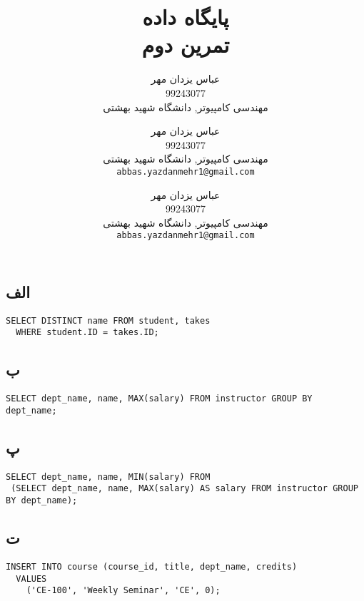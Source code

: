 \documentclass[a4paper]{article}
\author{
عباس یزدان مهر
\\
99243077\\
 مهندسی کامپیوتر, دانشگاه شهید بهشتی
\\
\emailone
	}
\makeatletter
\newcommand{\emailone}{\texttt{abbas.yazdanmehr1@gmail.com}}
\newcommand{\fulltitle}[2]{\title{#1 \\ #2}}
\newcommand{\myinf}{
	\author{
عباس یزدان مهر
\\
99243077\\
 مهندسی کامپیوتر, دانشگاه شهید بهشتی
\\
\emailone
	}
}
\makeatother
\begin{document}
\fulltitle{
پایگاه داده
}{
تمرین دوم
}

\myinf

\maketitle

\newpage


\section{}
\noindent \myinf
\subsection*{الف}

\begin{latin}
\begin{lstlisting}
SELECT DISTINCT name FROM student, takes 
  WHERE student.ID = takes.ID;
\end{lstlisting}
\end{latin}


\subsection*{ب}

\begin{latin}
\begin{lstlisting}
SELECT dept_name, name, MAX(salary) FROM instructor GROUP BY dept_name;
\end{lstlisting}
\end{latin}




\subsection*{پ}
\begin{latin}
\begin{lstlisting}
SELECT dept_name, name, MIN(salary) FROM
 (SELECT dept_name, name, MAX(salary) AS salary FROM instructor GROUP BY dept_name);
\end{lstlisting}
\end{latin}

\subsection*{ت}

\begin{latin}
\begin{lstlisting}
INSERT INTO course (course_id, title, dept_name, credits)
  VALUES
    ('CE-100', 'Weekly Seminar', 'CE', 0);
\end{lstlisting}
\end{latin}
\end{document}
